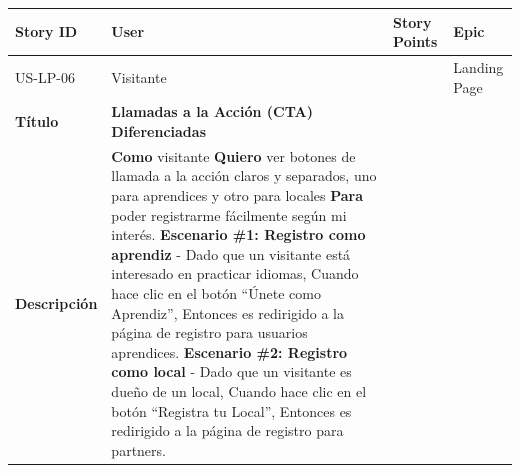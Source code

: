 {\def\LTcaptype{none} %
\begin{longtable}[]{@{}
  >{\raggedright\arraybackslash}p{}
  >{\raggedright\arraybackslash}p{}
  >{\raggedright\arraybackslash}p{}
  >{\raggedright\arraybackslash}p{}@{}}
\toprule\noalign{}
\begin{minipage}[b]{\linewidth}\raggedright
Story ID
\end{minipage} & \begin{minipage}[b]{\linewidth}\raggedright
User
\end{minipage} & \begin{minipage}[b]{\linewidth}\raggedright
Story Points
\end{minipage} & \begin{minipage}[b]{\linewidth}\raggedright
Epic
\end{minipage} \\
\midrule\noalign{}
\endhead
\bottomrule\noalign{}
\endlastfoot
US-LP-06 & Visitante & 2 & Landing Page \\
\textbf{Título} & \textbf{Llamadas a la Acción (CTA) Diferenciadas} &
& \\
\textbf{Descripción} & \textbf{Como} visitante \textbf{Quiero} ver
botones de llamada a la acción claros y separados, uno para aprendices y
otro para locales \textbf{Para} poder registrarme fácilmente según mi
interés. \textbf{Escenario \#1: Registro como aprendiz} - Dado que un
visitante está interesado en practicar idiomas, Cuando hace clic en el
botón ``Únete como Aprendiz'', Entonces es redirigido a la página de
registro para usuarios aprendices. \textbf{Escenario \#2: Registro como
local} - Dado que un visitante es dueño de un local, Cuando hace clic en
el botón ``Registra tu Local'', Entonces es redirigido a la página de
registro para partners. & & \\
\end{longtable}
}

